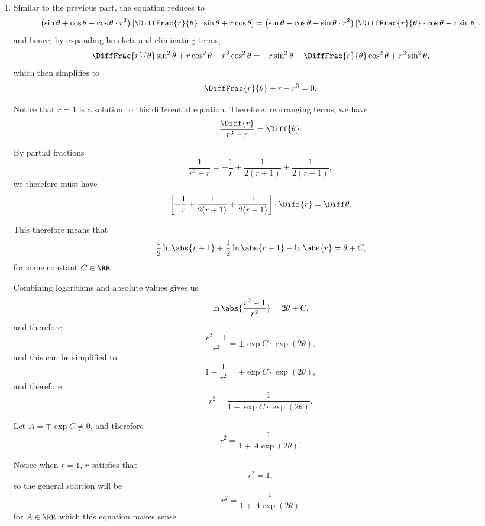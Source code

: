 \begin{enumerate}
    \item Similar to the previous part, the equation reduces to
          \[
              \left(\sin \theta + \cos \theta - \cos \theta \cdot r^2\right) \left[\DiffFrac{r}{\theta} \cdot \sin \theta + r \cos \theta\right] = \left(\sin \theta - \cos \theta - \sin \theta \cdot r^2\right) \left[\DiffFrac{r}{\theta} \cdot \cos \theta - r \sin \theta\right],
          \]
          and hence, by expanding brackets and eliminating terms,
          \[
              \DiffFrac{r}{\theta} \sin^2 \theta + r \cos^2 \theta - r^3 \cos^2 \theta = -r \sin^2 \theta - \DiffFrac{r}{\theta} \cos^2\theta + r^3 \sin^2 \theta,
          \]
          which then simplifies to
          \[
              \DiffFrac{r}{\theta} + r - r^3 = 0.
          \]

          Notice that \(r = 1\) is a solution to this differential equation. Therefore, rearranging terms, we have
          \[
              \frac{\Diff{r}}{r^3 - r} = \Diff{\theta}.
          \]

          By partial fractions
          \[
              \frac{1}{r^3 - r} = -\frac{1}{r} + \frac{1}{2(r + 1)} + \frac{1}{2(r - 1)},
          \]
          we therefore must have
          \[
              \left[-\frac{1}{r} + \frac{1}{2(r + 1)} + \frac{1}{2(r - 1)}\right] \cdot \Diff{r} = \Diff \theta.
          \]

          This therefore means that
          \[
              \frac{1}{2} \ln \abs{r + 1} + \frac{1}{2} \ln \abs{r - 1} - \ln \abs{r} = \theta + C,
          \]
          for some constant \(C \in \RR\).

          Combining logarithms and absolute values gives us
          \[
              \ln \abs{\frac{r^2 - 1}{r^2}} = 2\theta + C,
          \]
          and therefore,
          \[
              \frac{r^2 - 1}{r^2} = \pm \exp C \cdot \exp(2\theta),
          \]
          and this can be simplified to
          \[
              1 - \frac{1}{r^2} = \pm \exp C \cdot \exp(2\theta),
          \]
          and therefore
          \[
              r^2 = \frac{1}{1 \mp \exp C \cdot \exp(2\theta)}.
          \]

          Let \(A = \mp \exp C \neq 0\), and therefore
          \[
              r^2 = \frac{1}{1 + A \exp(2 \theta)}.
          \]

          Notice when \(r = 1\), \(r\) satisfies that
          \[
              r^2 = 1,
          \]
          so the general solution will be
          \[
              r^2 = \frac{1}{1 + A \exp(2 \theta)}
          \]
          for \(A \in \RR\) which this equation makes sense.


\end{enumerate}
